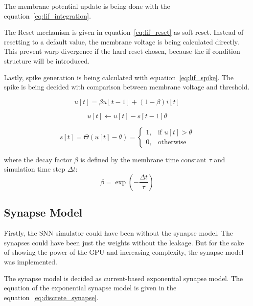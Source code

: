\documentclass[conference]{IEEEtran}
\begin{document}
The membrane potential update is being done with the equation~\ref{eq:lif_integration}. 

The Reset mechanism is given in equation~\ref{eq:lif_reset} as soft reset. 
Instead of resetting to a default value, 
the membrane voltage is being calculated directly.
This prevent warp divergence if the hard reset chosen, 
because the if condition structure will be introduced.

Lastly, spike generation is being calculated with equation~\ref{eq:lif_spike}. 
The spike is being decided with comparison between membrane voltage and threshold.


\begin{equation}
u[t] = \beta u[t-1] + (1 - \beta) i[t]
\label{eq:lif_integration}
\end{equation}

\begin{equation}
u[t] \leftarrow u[t] - s[t-1]\theta
\label{eq:lif_reset}
\end{equation}

\begin{equation}
s[t] = \Theta(u[t] - \theta) = 
\begin{cases} 
1, & \text{if } u[t] > \theta \\
0, & \text{otherwise}
\end{cases}
\label{eq:lif_spike}
\end{equation}

where the decay factor $\beta$ is defined by the membrane time constant $\tau$ and simulation time step $\Delta t$:
\begin{equation}
\beta = \exp\left(-\frac{\Delta t}{\tau}\right)
\end{equation}

\subsection{Synapse Model}


Firstly, the SNN simulator could have been without the synapse model. The synapses could have been just the weights without the leakage. 
But for the sake of showing the power of the GPU and increasing complexity, the synapse model was implemented.

The synapse model is decided as current-based exponential synapse model.
The equation of the exponential synapse model is given in the equation~\ref{eq:discrete_synapse}.\\
\end{document}
